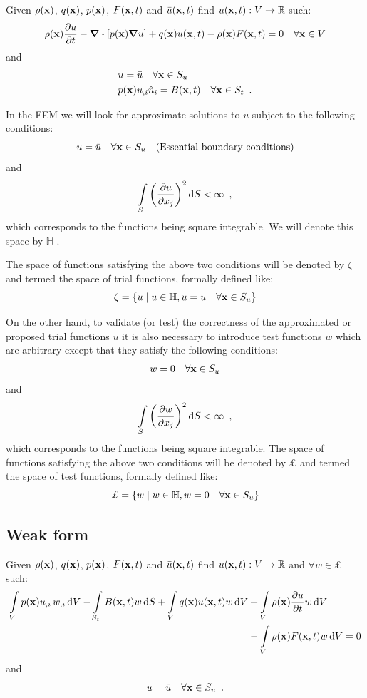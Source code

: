 Given $\rho(\vb x)$, $q(\vb x)$, $p(\vb x)$, $F(\vb x, t)$ and $\bar u (\vb x , t)$ find $u(\vb x , t):V \to \mathbb{R}$ such:
\[\rho(\vb x) \pdv{u}{t} - \div \left[p(\vb x) \grad u\right] + q(\vb x) u(\vb x, t) - \rho(\vb x) F(\vb x, t) = 0 \quad \forall \vb x \in V \]
and
\begin{align*}
    &u = \bar u \quad \forall \vb x \in S_u\\
    &p(\vb x)u_{,i} \hat n_i= B(\vb x,t)\quad \forall \vb x \in  S_t \enspace .
\end{align*}


In the FEM we will look for approximate solutions to $u$ subject to the following conditions:
\[u = \bar u \quad \forall \vb x \in S_u \quad \text{(Essential boundary conditions)}\] 
and
\[\int\limits_S \left(\pdv{u}{x_j}\right)^2 \dd{S} < \infty \enspace ,\]
which corresponds to the functions being square integrable. We will denote this space by $\mathbb{H}$ .

The space of functions satisfying the above two conditions will be denoted by $\zeta$ and termed the space of trial functions, formally defined like:
\[\zeta  = \left\{ u \mid u \in \mathbb{H},u = \bar u \quad \forall\vb x  \in S_u \right\}\]

On the other hand, to validate (or test) the correctness of the approximated or proposed trial functions $u$ it is also necessary to introduce test functions $w$ which are arbitrary except that they satisfy the following conditions:
\[w = 0\quad \forall \vb x \in S_u\] 
and
\[\int\limits_S \left(\pdv{w}{x_j}\right)^2 \dd{S} < \infty \enspace ,\]
which corresponds to the functions being square integrable. The space of functions satisfying the above two conditions will be denoted by $\pounds$ and termed the space of test functions, formally defined like:
\[\pounds  = \left\{w \mid w \in \mathbb{H},w = 0 \quad \forall \vb x \in S_u\right\}\]

\subsection{Weak form}
Given $\rho(\vb x)$, $q(\vb x)$, $p(\vb x)$, $F(\vb x, t)$ and $\bar u (\vb x , t)$ find $u(\vb x , t):V \to \mathbb{R}$ and $\forall w \in \pounds$ such:
\begin{align*}
\int\limits_V p(\vb x) u_{,i}\, w_{,i}\dd{V} - \int\limits_{S_t} B(\vb x, t)w \dd{S}  + \int\limits_V q(\vb x)u(\vb x, t)w\dd{V}  &+ \int\limits_V \rho(\vb x)\pdv{u}{t}w \dd{V} \\& - \int\limits_V \rho(\vb x) F(\vb x, t)w\dd{V} = 0
\end{align*}
and
\[u = \bar u\quad \forall\vb x \in S_u \enspace .\]

